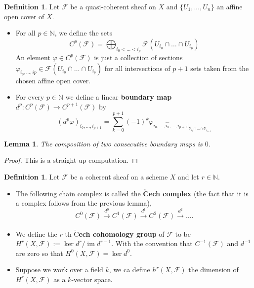 \documentclass{article}
\theoremstyle{plain}
\newtheorem{lemma}[theorem]{Lemma}
\theoremstyle{definition}
\newtheorem{definition}[theorem]{Definition}
\DeclareMathOperator{\im}{im}
\begin{document}
\begin{definition}
    Let $\mathcal{F}$ be a quasi-coherent sheaf on $X$ and $\{U_1,...,U_n\}$ an affine open cover of $X$.
    \begin{itemize}
        \item[$a)$] For all $p\in \mathbb{N}$, we define the sets 
        $$C^p(\mathcal{F}) = \bigoplus_{i_0<\dots< i_p} \mathcal{F}(U_{i_0} \cap \dots \cap U_{i_p})$$
        An element $\varphi \in C^p(\mathcal{F})$ is just a collection of sections $\varphi_{i_0,\dots ,ip}\in \mathcal{F}(U_{i_0} \cap \dots \cap U_{i_p})$ for all intersections of $p+1$ sets taken from the chosen affine open cover. 

        \item[$b)$] For every $p\in \mathbb{N}$ we define a linear \textbf{boundary map} $d^p: C^p(\mathcal{F}) \rightarrow C^{p+1}(\mathcal{F})$ by 
        $$(d^p\varphi)_{i_0,\dots,i_{p+1}} = \sum^{p+1}_{k=0} (-1)^k \varphi_{i_0,\dots,\hat{i_k},\dots, i_{p+1} \vert_{U_{i_0}\cap\dots \cap U_{i_{p+1}}}}$$
    \end{itemize}
\end{definition}



\begin{lemma}
    The composition of two consecutive boundary maps is $0$.
\end{lemma}
\begin{proof}
    This is a straight up computation.
\end{proof}


\begin{definition}
    Let $\mathcal{F}$ be a coherent sheaf on a scheme $X$ and let $r\in \mathbb{N}$.
    \begin{itemize}
    \item[$a)$]
    The following chain complex is called  the \textbf{$\check{\textbf{C}}$ech complex} (the fact that it is a complex follows from the previous lemma),
    $$C^0(\mathcal{F}) \xrightarrow[]{d^0} C^1(\mathcal{F})\xrightarrow[]{d^1} C^2(\mathcal{F})\xrightarrow[]{d^2} \dots.$$
    \item[$b)$] We define the $r$-th \textbf{$\check{\text{C}}$ech cohomology group} of $\mathcal{F}$ to be $H^r(X,\mathcal{F}) := \ker d^r / \im d^{r-1}$.
    With the convention that $C^{-1}(\mathcal{F})$ and $d^{-1}$ are zero so that $H^0(X,\mathcal{F}) = \ker d^0$.
    \item[$c)$] Suppose we work over a field $k$, we ca define $h^r(X,\mathcal{F})$ the dimension of $H^r(X,\mathcal{F})$ as a $k$-vector space.
    \end{itemize}
\end{definition}
\end{document}
